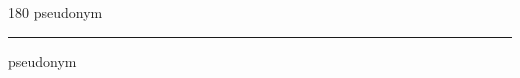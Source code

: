 
\begin{frame}
\begin{center}
\begin{turn}{180}
{\fontsize{2.5cm}{1em}\selectfont pseudonym}
\end{turn}
\vspace{1em}\par  
\hrule
\vspace{1em}\par  
{\fontsize{2.5cm}{1em}\selectfont pseudonym}
\end{center}
\end{frame}
